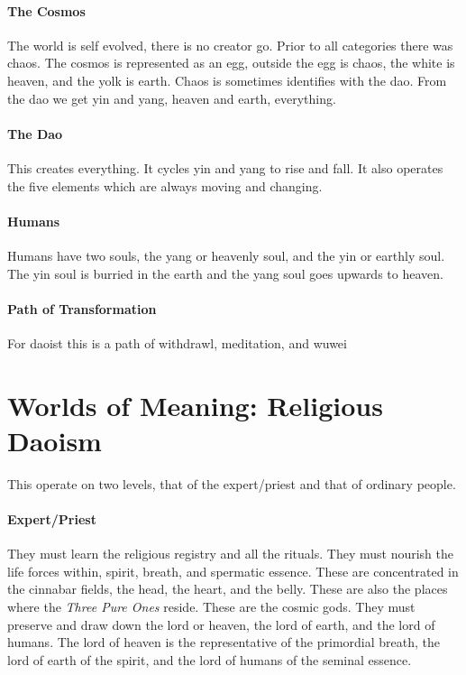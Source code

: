 \documentclass{article}
\begin{document}
\paragraph{The Cosmos}
\label{par:the_cosmos}
The world is self evolved, there is no creator go. Prior to all categories there was chaos. The cosmos is represented as an egg, outside the egg is chaos, the white is heaven, and the yolk is earth. Chaos is sometimes identifies with the dao. From the dao we get yin and yang, heaven and earth, everything.

\paragraph{The Dao}
 \label{par:the_dao}
This creates everything. It cycles yin and yang to rise and fall. It also operates the five elements which are always moving and changing.

\paragraph{Humans}
\label{par:humans}
Humans have two souls, the yang or heavenly soul, and the yin or earthly soul. The yin soul is burried in the earth and the yang soul goes upwards to heaven.

\paragraph{Path of Transformation}
\label{par:path_of_transformation}
For daoist this is a path of withdrawl, meditation, and wuwei

\section*{Worlds of Meaning: Religious Daoism}
\label{sec:worlds_of_meaning_religious_daoism}
This operate on two levels, that of the expert/priest and that of ordinary people.

\paragraph{Expert/Priest}
\label{par:expert_priest}
They must learn the religious registry and all the rituals. They must nourish the life forces within, spirit, breath, and spermatic essence. These are concentrated in the cinnabar fields, the head, the heart, and the belly. These are also the places where the \emph{Three Pure Ones} reside. These are the cosmic gods. They must preserve and draw down the lord or heaven, the lord of earth, and the lord of humans. The lord of heaven is the representative of the primordial breath, the lord of earth of the spirit, and the lord of humans of the seminal essence.
\end{document}

